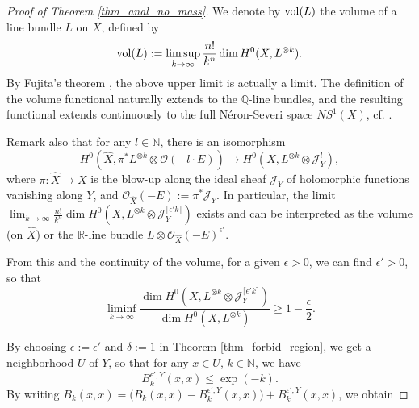 \documentclass[12pt]{article}
\numberwithin{equation}{section}
\theoremstyle{theorem}
\theoremstyle{definition}
\theoremstyle{remark}
\newcommand{\nat}{\mathbb{N}}
\begin{document}
	\begin{proof}[Proof of Theorem \ref{thm_anal_no_mass}]
		We denote by ${\rm vol}(L)$ the volume of a line bundle $L$ on $X$, defined by
		\begin{equation}\label{defn_vol}
			{\rm{vol}}(L) := \limsup_{k \to \infty} \frac{n!}{k^n} \dim H^0(X, L^{\otimes k}).
		\end{equation}
		By Fujita's theorem \cite{Fujita}, the above upper limit is actually a limit.
		The definition of the volume functional naturally extends to the $\mathbb{Q}$-line bundles, and the resulting functional extends continuously to the full Néron-Severi space $NS^1(X)$, cf. \cite[Theorem 2.2.44]{LazarBookI}.
		\par 
		\begin{sloppypar}
		Remark also that for any $l \in \nat$, there is an isomorphism 
		\begin{equation}\label{eq_isom_blow}
			H^0(\hat{X}, \pi^* L^{\otimes k} \otimes \mathscr{O}(- l \cdot E)) \to H^0(X, L^{\otimes k} \otimes \mathcal{J}_{Y}^l),
		\end{equation}
		where $\pi : \hat{X} \to X$ is the blow-up along the ideal sheaf $\mathcal{J}_{Y}$ of holomorphic functions vanishing along $Y$, and $\mathscr{O}_{\hat{X}}(-E) := \pi^* \mathcal{J}_{Y}$.
		In particular, the limit $\lim_{k \to \infty} \frac{n!}{k^n} \dim H^0(X, L^{\otimes k} \otimes \mathcal{J}_{Y}^{\lceil \epsilon' k \rceil})$ exists and can be interpreted as the volume (on $\hat{X}$) or the $\mathbb{R}$-line bundle $L \otimes \mathscr{O}_{\hat{X}}(-E)^{\epsilon'}$.
		\end{sloppypar}
		\par 
		From this and the continuity of the volume, for a given $\epsilon > 0$, we can find $\epsilon' > 0$, so that 
		\begin{equation}\label{eq_vol_cont}
			\liminf_{k \to \infty} \frac{\dim H^0(X, L^{\otimes k} \otimes \mathcal{J}_{Y}^{\lceil \epsilon' k \rceil})}{\dim H^0(X, L^{\otimes k})}
			\geq 1 - \frac{\epsilon}{2}.
		\end{equation}
		\par 
		By choosing $\epsilon := \epsilon'$ and $\delta := 1$ in Theorem \ref{thm_forbid_region}, we get a neighborhood $U$ of $Y$, so that for any $x \in U$, $k \in \nat$, we have 
		\begin{equation}\label{eq_exp_bnd}
				B_k^{\epsilon', Y}(x, x) \leq \exp(- k).
		\end{equation}
		By writing $B_k(x, x) = \big(B_k(x, x) - B_k^{\epsilon', Y}(x, x)\big) + B_k^{\epsilon', Y}(x, x)$, we obtain

\end{proof}
\end{document}
